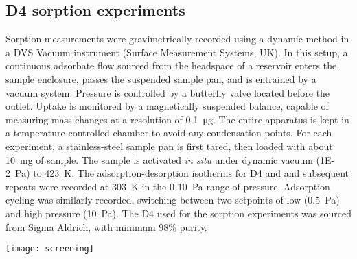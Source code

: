 \subsection{D4 sorption experiments}\label{methodology-d4sorption}

Sorption measurements were gravimetrically recorded using a dynamic method in a
DVS Vacuum instrument (Surface Measurement Systems, UK). In this setup, a
continuous adsorbate flow sourced from the headspace of a reservoir enters the
sample enclosure, passes the suspended sample pan, and is entrained by a vacuum
system. Pressure is controlled by a butterfly valve located before the outlet.
Uptake is monitored by a magnetically suspended balance, capable of measuring
mass changes at a resolution of \SI{0.1}{\micro\gram}. The entire apparatus is
kept in a temperature-controlled chamber to avoid any condensation points. For
each experiment, a stainless-steel sample pan is first tared, then loaded with
about \SI{10}{\milli\gram} of sample. The sample is activated \emph{in situ}
under dynamic vacuum (\SI{1E-2}{\pascal}) to \SI{423}{\kelvin}. The
adsorption-desorption isotherms for D4 and  and subsequent repeats were
recorded at \SI{303}{\kelvin} in the 0-\SI{10}{\pascal} range of pressure.
Adsorption cycling was similarly recorded, switching between two setpoints of
low (\SI{0.5}{\pascal}) and high pressure (\SI{10}{\pascal}). The D4 used for
the sorption experiments was sourced from Sigma Aldrich, with minimum 98\%
purity.

\begin{widefigure}[b]
    \centering
    \texttt{[image: screening]}
    \caption{%
        (a) Predicted D4 uptake performance at \SI{298}{\kelvin} for the
        hydrophobic MOF database plotted as a function of computed \(\Delta
        H_{st,H_{2}O}^{0}\), and colour coded by void fraction, \(\phi\). Top
        performing 10 candidates are represented by different symbols in the
        legend. (b) Relation between gravimetric (\si{\gram\per\gram}) and
        volumetric (\si{\gram\per\centi\metre\cubed}) D4 uptake for all MOFs at
        \SI{298}{\kelvin}. Marker size represents PV while colour denotes
        \(\phi\). Dashed line represents the gravimetric and volumetric uptake
        of benchmark MIL-101(Cr)\citep{gargiuloChromiumbasedMIL101Metal2019}.
        (c) The structure of our promising material identified for D4 uptake,
        PCN-777. Zr, N, O, C, and H atoms are depicted in light blue, dark blue,
        red, dark grey, and light grey, respectively.
    }\label{fig:d4-screening}
\end{widefigure}

